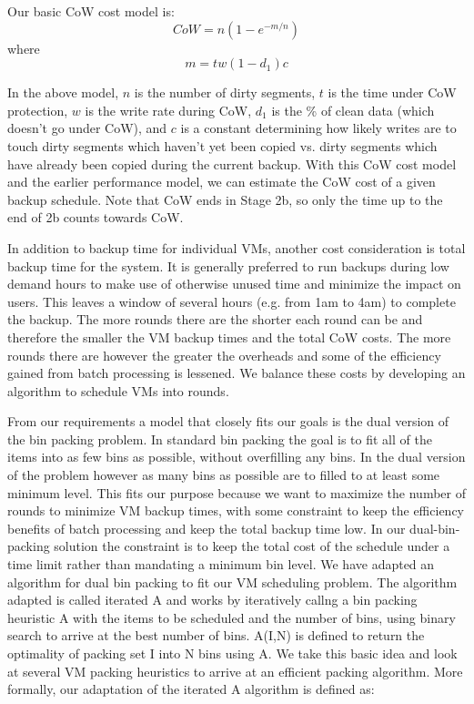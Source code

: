 Our basic CoW cost model is:
\[
    CoW=n(1-e^{-m/n})
\]
    where
\[
    m=tw(1-d_1)c
\]

In the above model, $n$ is the number of dirty segments, $t$ is the time under
CoW protection, $w$ is the
write rate during CoW, $d_1$ is the \% of clean data (which doesn't go under
CoW), and $c$ is a constant determining how likely writes are to touch dirty
segments which haven't yet been copied vs. dirty segments which have already
been copied during the current backup. With this CoW cost model and the earlier
performance model, we can estimate the CoW cost of a given backup schedule.
Note that CoW ends in Stage 2b, so only the time up to the end of 2b counts
towards CoW. 

In addition to backup time for individual VMs, another cost consideration is
total backup time for the system. It is generally preferred to run backups
during low demand hours to make use of otherwise unused time and minimize the
impact on users. This leaves a window of several hours (e.g. from 1am to 4am)
to complete the backup. The more rounds there
are the shorter each round can be and therefore the smaller the VM backup times
and the total CoW costs. The
more rounds there are however the greater the overheads and some of the
efficiency gained from batch processing is lessened. We balance these costs by
developing an algorithm to schedule VMs into rounds.

From our requirements a model that closely fits our goals is the dual version
of the
bin packing problem. In standard bin packing the goal is to fit all of the
items into as few bins as possible, without overfilling any bins. In the dual
version of the problem however as many bins as possible are to filled to at
least some minimum level. This fits our purpose because we want to maximize the
number of rounds to minimize VM backup times, with some constraint to keep the
efficiency benefits of batch processing and keep the total backup time low.
In our dual-bin-packing solution the constraint is to keep the total
cost of the schedule under a time limit rather than mandating a minimum bin
level. We have adapted
an algorithm for dual bin packing\cite{DualBinPacking} to fit our VM
scheduling problem. The algorithm adapted is called iterated A and works by
iteratively callng a bin packing heuristic A with the items to be scheduled and
the number of bins, using binary search to arrive at the best number of
bins. A(I,N) is defined to return the optimality of packing set I into N bins
using A. We take this basic idea and look at several VM packing heuristics to
arrive at an efficient packing algorithm. More formally, our adaptation of the
iterated A algorithm is defined as:


